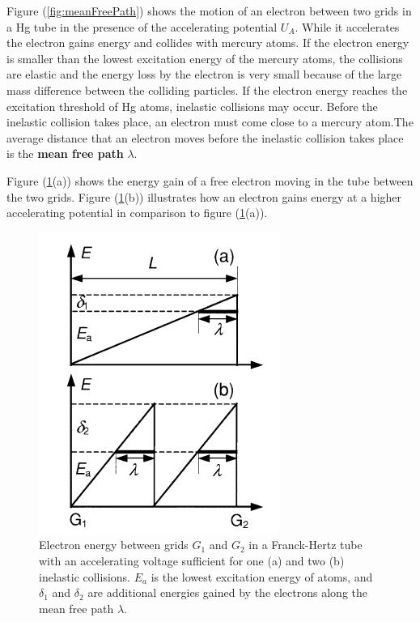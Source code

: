 \documentclass[%
 reprint,
 amsmath,amssymb,
 aps,
]{revtex4-2}
\begin{document}
    \par
    Figure (\ref{fig:meanFreePath}) shows the motion of an electron between two grids in a Hg tube in the presence of the accelerating potential $U_A$. While it accelerates the electron gains energy and collides with mercury atoms. If the electron energy is smaller than the lowest excitation energy of the mercury atoms, the collisions are elastic and the energy loss by the electron is very small because of the large mass difference between the colliding particles. If the electron energy reaches the excitation threshold of Hg atoms, inelastic collisions may occur. Before the inelastic collision takes place, an electron must come close to a mercury atom.The average distance that an electron moves before the inelastic collision takes place is the \textbf{mean free path} $\lambda$.
    \par
    Figure (\ref{fig:gridLevels}(a)) shows the energy gain of a free electron moving in the tube between the two grids. Figure (\ref{fig:gridLevels}(b)) illustrates how an electron gains energy at a higher accelerating potential in comparison to figure (\ref{fig:gridLevels}(a)). 
    \begin{figure}[b]
        \centering
        \includegraphics{Figures/gridlevels.png}
        \caption{Electron energy between grids $G_1$ and $G_2$ in a Franck-Hertz tube with an accelerating voltage sufficient for one (a) and two (b) inelastic collisions. $E_a$ is the lowest excitation energy of atoms, and $\delta_1$ and $\delta_2$ are additional energies gained by the electrons along the mean free path $\lambda$.}
        \label{fig:gridLevels}
    \end{figure}
\end{document}
